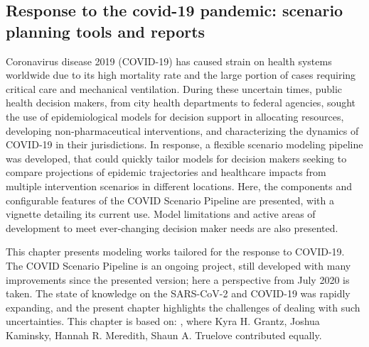 \begin{fullwidth}
\chapter[Response to the covid-19 pandemic: scenario planning tools and reports]{Response to the covid-19 pandemic: scenario planning tools and reports}
\label{sec:covid-pipeline-reports}
Coronavirus disease 2019 (COVID-19) has caused strain on health systems worldwide due to its high mortality rate and the large portion of cases requiring critical care and mechanical ventilation. During these uncertain times, public health decision makers, from city health departments to federal agencies, sought the use of epidemiological models for decision support in allocating resources, developing non‑pharmaceutical interventions, and characterizing the dynamics of COVID‑19 in their jurisdictions. In response, a flexible scenario modeling pipeline was developed, that could quickly tailor models for decision makers seeking to compare projections of epidemic trajectories and healthcare impacts from multiple intervention scenarios in different locations. Here, the components and configurable features of the COVID Scenario Pipeline are presented, with a vignette detailing its current use. Model limitations and active areas of development to meet ever‑changing decision maker needs are also presented.
  
This chapter presents modeling works tailored for the response to COVID-19. The COVID Scenario Pipeline is an ongoing project, still developed with many improvements since the presented version; here a perspective from July 2020 is taken. The state of knowledge on the SARS-CoV-2 and COVID-19 was rapidly expanding, and the present chapter highlights the challenges of dealing with such uncertainties. This chapter is based on:
, where Kyra H. Grantz, Joshua Kaminsky, Hannah R. Meredith, Shaun A. Truelove contributed equally.
  \end{fullwidth}




